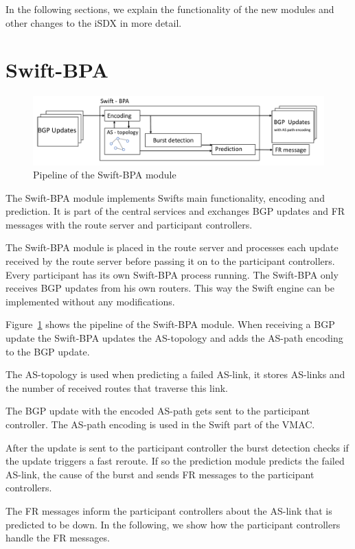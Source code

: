 In the following sections, we explain the functionality of the new modules and other changes to the iSDX in more detail.

\section{\label{chapter4:Swift-BPA}Swift-BPA}

\begin{figure}[h]
\center
\includegraphics[scale = 0.5]{Figures/design_swift_bpa_cropped.pdf}
\caption{Pipeline of the Swift-BPA module}
\label{fig:PipelineBPA}
\end{figure}

The Swift-BPA module implements Swifts main functionality, encoding and prediction. It is part of the central services and exchanges BGP updates and FR messages with the route server and participant controllers.

The Swift-BPA module is placed in the route server and processes each update received by the route server before passing it on to the participant controllers. 
Every participant has its own Swift-BPA process running. The Swift-BPA only receives BGP updates from his own routers. This way the Swift engine can be implemented without any modifications.

Figure~\ref{fig:PipelineBPA} shows the pipeline of the Swift-BPA module. When receiving a BGP update the Swift-BPA updates the AS-topology and adds the AS-path encoding to the BGP update. 

The AS-topology is used when predicting a failed AS-link, it stores AS-links and the number of received routes that traverse this link.

The BGP update with the encoded AS-path gets sent to the participant controller. The AS-path encoding is used in the Swift part of the VMAC.
 
After the update is sent to the participant controller the burst detection checks if the update triggers a fast reroute. If so the prediction module predicts the failed AS-link, the cause of the burst and sends FR messages to the participant controllers. 

The FR messages inform the participant controllers about the AS-link that is predicted to be down. In the following, we show how the participant controllers handle the FR messages.



